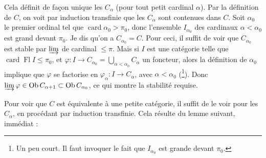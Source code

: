 \documentclass[11pt]{article}
\newcommand{\printedpage}[1]{\marginpar{\footnotesize p.~#1}}
\newcommand{\msp}[1]{\marginpar{\footnotesize [#1]}}
\begin{document}
Cela définit de façon unique les $C_\alpha$ (pour tout petit cardinal $\alpha$). Par la définition de $C$, on voit par induction transfinie que les $C_\alpha$ sont contenues dans $C$. Soit $\alpha_0$
\printedpage{45}
\msp{page 141}
le premier ordinal tel que $\operatorname{card}\alpha_0>\pi_0$, donc l'ensemble $I_{\alpha_0}$ des cardinaux $\alpha<\alpha_0$ est grand devant $\pi_0$. Je dis qu'on a $C_{\alpha_0}=C$. Pour ceci, il suffit de voir que $C_{\alpha_0}$ est stable par $\varinjlim$ de cardinal $\leqslant\pi$. Mais si $I$ est une catégorie telle que $\operatorname{card}\operatorname{Fl}I\leqslant\pi_0$, et $\varphi : I\longrightarrow C_{\alpha_0}=\bigcup_{\alpha<\alpha_0}C_\alpha$ un foncteur, alors la définition de $\alpha_0$ implique que $\varphi$ se factorise en $\varphi_\alpha : I\longrightarrow C_\alpha$, avec $\alpha<\alpha_0$ (\footnote[55]{Un peu court. Il faut invoquer le fait que $I_{\alpha_0}$ est grande devant $\pi_0$.}). Donc $\varinjlim\varphi\in\operatorname{Ob}C_{\alpha+1}\subset\operatorname{Ob}C_{\alpha_0}$, ce qui montre la stabilité requise. %

Pour voir que $C$ est équivalente à une petite catégorie, il suffit de le voir pour les $C_\alpha$, en procédant par induction transfinie. Cela résulte du lemme suivant, immédiat :
\end{document}
